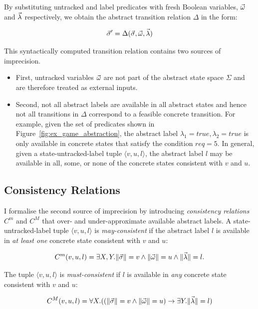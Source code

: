 By substituting untracked and label predicates with fresh Boolean variables, $\vec{\omega}$ and $\vec{\lambda}$ respectively, we obtain the abstract transition relation $\Delta$ in the form:

$$
\vec{\sigma}'=\Delta(\vec{\sigma},\vec{\omega},\vec{\lambda})
$$

This syntactically computed transition relation contains two sources of imprecision.  

\begin{itemize}
    \item First, untracked variables $\vec{\omega}$ are not part of the abstract state space $\Sigma$ and are therefore treated as external inputs.  
    \item Second, not all abstract labels  are available in all abstract states and hence not all transitions in $\Delta$ correspond to a feasible concrete transition.  For example, given the set of predicates shown in Figure~\ref{fig:ex_game_abstraction}, the abstract label $\lambda_1 = true, \lambda_2 = true$ is only available in concrete states that satisfy the condition $req=5$.  In general, given a state-untracked-label tuple $\langle v,u,l\rangle$, the abstract label $l$ may be available in all, some, or none of the concrete states consistent with $v$ and $u$.  
\end{itemize}

\subsection{Consistency Relations}

I formalise the second source of imprecision by introducing \emph{consistency relations} $C^m$ and $C^M$ that over- and under-approximate available abstract labels.  A state-untracked-label tuple $\langle v,u,l\rangle$ is \emph{may-consistent} if the abstract label $l$ is available in \emph{at least one} concrete state consistent with $v$ and $u$:

\begin{equation} 
    \label{eqn:cm}
    C^m(v,u,l) = \exists X,Y. \|\vec{\sigma}\|=v \land \|\vec{\omega}\|=u \land \|\vec{\lambda}\|=l.
\end{equation}

The tuple $\langle v,u,l\rangle$ is \emph{must-consistent} if $l$ is available in \emph{any} concrete state consistent with $v$ and $u$:

\begin{equation}
    \label{eqn:cM}
    C^M(v,u,l) = \forall X . ((\|\vec{\sigma}\|=v \land \|\vec{\omega}\|=u) \rightarrow \exists Y.  \|\vec{\lambda}\|=l)
\end{equation}

